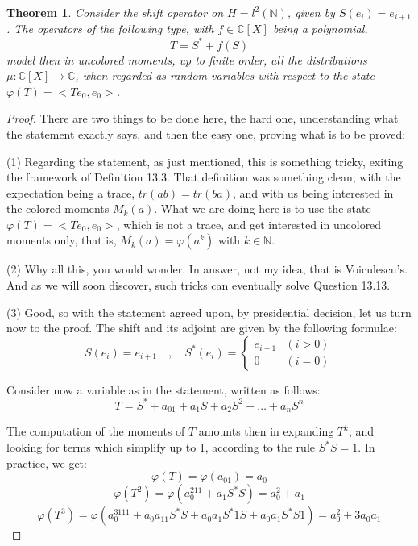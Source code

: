 \documentclass[12pt]{amsbook}
\newtheorem{theorem}{Theorem}[chapter]
\begin{document}

\begin{theorem}
Consider the shift operator on $H=l^2(\mathbb N)$, given by $S(e_i)=e_{i+1}$. The operators of the following type, with $f\in\mathbb C[X]$ being a polynomial, 
$$T=S^*+f(S)$$
model then in uncolored moments, up to finite order, all the distributions $\mu:\mathbb C[X]\to\mathbb C$, when regarded as random variables with respect to the state $\varphi(T)=<Te_0,e_0>$.
\end{theorem}

\begin{proof}
There are two things to be done here, the hard one, understanding what the statement exactly says, and then the easy one, proving what is to be proved:

\medskip

(1) Regarding the statement, as just mentioned, this is something tricky, exiting the framework of Definition 13.3. That definition was something clean, with the expectation being a trace, $tr(ab)=tr(ba)$, and with us being interested in the colored moments $M_k(a)$. What we are doing here is to use the state $\varphi(T)=<Te_0,e_0>$, which is not a trace, and get interested in uncolored moments only, that is, $M_k(a)=\varphi(a^k)$ with $k\in\mathbb N$.

\medskip

(2) Why all this, you would wonder. In answer, not my idea, that is Voiculescu's. And as we will soon discover, such tricks can eventually solve Question 13.13.

\medskip

(3) Good, so with the statement agreed upon, by presidential decision, let us turn now to the proof. The shift and its adjoint are given by the following formulae:
$$S(e_i)=e_{i+1}\quad,\quad S^*(e_i)=
\begin{cases}
e_{i-1}&(i>0)\\
0&(i=0)
\end{cases}$$

Consider now a variable as in the statement, written as follows:
$$T=S^*+a_01+a_1S+a_2S^2+\ldots+a_nS^n$$

The computation of the moments of $T$ amounts then in expanding $T^k$, and looking for terms which simplify up to 1, according to the rule $S^*S=1$. In practice, we get:
$$\varphi(T)=\varphi(a_01)=a_0$$
$$\varphi(T^2)=\varphi(a_0^211+a_1S^*S)=a_0^2+a_1$$
$$\varphi(T^3)=\varphi(a_0^3111+a_0a_11S^*S+a_0a_1S^*1S+a_0a_1S^*S1)=a_0^2+3a_0a_1$$


\end{proof}
\end{document}
